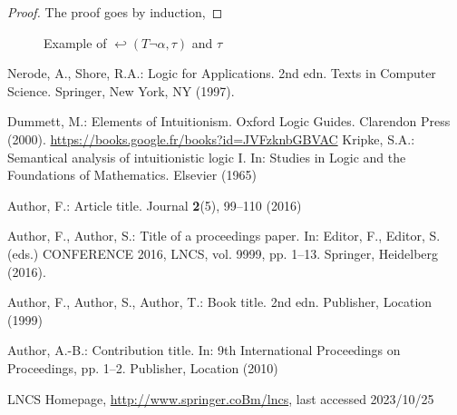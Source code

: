 \documentclass[runningheads]{llncs}
\begin{document}
\begin{proof}
    The proof goes by induction, 
\end{proof}


\begin{figure}
\centering
{}
\caption{Example of $\hookleftarrow(T \neg \alpha ,\tau)$ and $\tau$ } 
\label{fig:tree_expansion}
\end{figure}



%
%
%
% 
% 
%
\begin{thebibliography}{8}

    Nerode, A., Shore, R.A.: Logic for Applications. 2nd edn. Texts in Computer Science. Springer, New York, NY (1997). 
    
    Dummett, M.: Elements of Intuitionism. Oxford Logic Guides. Clarendon Press (2000). \url{https://books.google.fr/books?id=JVFzknbGBVAC}
    Kripke, S.A.: Semantical analysis of intuitionistic logic I. In: Studies in Logic and the Foundations of Mathematics. Elsevier (1965)


Author, F.: Article title. Journal \textbf{2}(5), 99--110 (2016)

Author, F., Author, S.: Title of a proceedings paper. In: Editor,
F., Editor, S. (eds.) CONFERENCE 2016, LNCS, vol. 9999, pp. 1--13.
Springer, Heidelberg (2016). 

Author, F., Author, S., Author, T.: Book title. 2nd edn. Publisher,
Location (1999)

Author, A.-B.: Contribution title. In: 9th International Proceedings
on Proceedings, pp. 1--2. Publisher, Location (2010)


LNCS Homepage, \url{http://www.springer.coBm/lncs}, last accessed 2023/10/25
\end{thebibliography}
\end{document}
